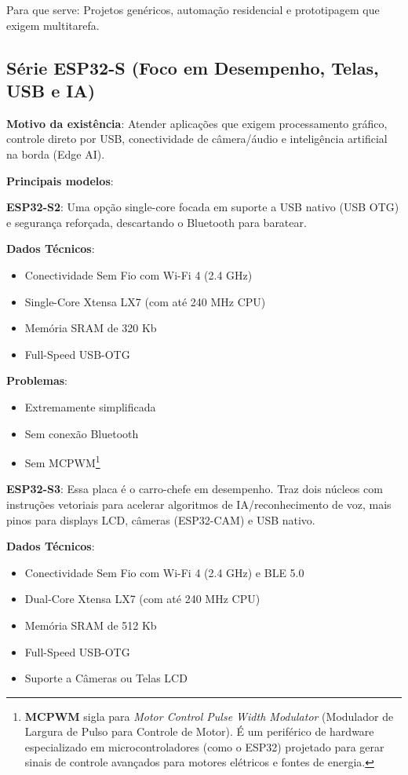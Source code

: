 \documentclass[a4paper,11pt]{article}
\begin{document}
Para que serve: Projetos genéricos, automação residencial e prototipagem que exigem multitarefa.  

\subsection{Série ESP32-S (Foco em Desempenho, Telas, USB e IA)}
\textbf{Motivo da existência}: Atender aplicações que exigem processamento gráfico, controle direto por USB, conectividade de câmera/áudio e inteligência artificial na borda (Edge AI).  

\textbf{Principais modelos}:

\textbf{ESP32-S2}: Uma opção single-core focada em suporte a USB nativo (USB OTG) e segurança reforçada, descartando o Bluetooth para baratear.  

\textbf{Dados Técnicos}: \vspace{-1em}
\begin{itemize}[nolistsep]
	\item Conectividade Sem Fio	com Wi-Fi 4 (2.4 GHz)
	\item Single-Core Xtensa LX7 (com até 240 MHz CPU)
	\item Memória SRAM de 320 Kb
	\item Full-Speed USB-OTG
\end{itemize}

\textbf{Problemas}: \vspace{-1em}
\begin{itemize}[nolistsep]
	\item Extremamente simplificada
	\item Sem conexão Bluetooth
	\item Sem MCPWM\footnote{\textbf{MCPWM} sigla para \textit{Motor Control Pulse Width Modulator} (Modulador de Largura de Pulso para Controle de Motor). É um periférico de hardware especializado em microcontroladores (como o ESP32) projetado para gerar sinais de controle avançados para motores elétricos e fontes de energia.}
\end{itemize}

\textbf{ESP32-S3}: Essa placa é o carro-chefe em desempenho. Traz dois núcleos com instruções vetoriais para acelerar algoritmos de IA/reconhecimento de voz, mais pinos para displays LCD, câmeras (ESP32-CAM) e USB nativo.  

\textbf{Dados Técnicos}: \vspace{-1em}
\begin{itemize}[nolistsep]
	\item Conectividade Sem Fio	com Wi-Fi 4 (2.4 GHz) e BLE 5.0
	\item Dual-Core Xtensa LX7 (com até 240 MHz CPU)
	\item Memória SRAM de 512 Kb
	\item Full-Speed USB-OTG
	\item Suporte a Câmeras ou Telas LCD
\end{itemize}
\end{document}
